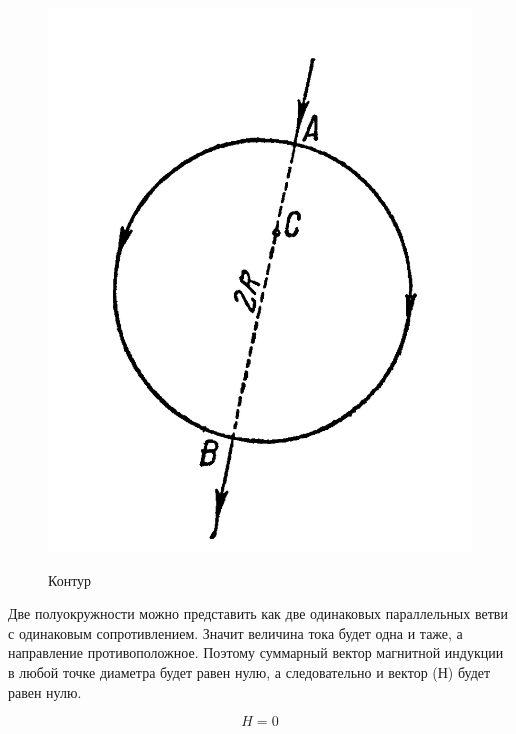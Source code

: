 \begin{figure}[H]
	\centering
	\includegraphics[width=0.4\linewidth]{task_pic}
	\label{task_pic}
	\caption{Контур}
\end{figure}

Две полуокружности можно представить как две одинаковых параллельных ветви с одинаковым сопротивлением.
Значит величина тока будет одна и таже, а направление противоположное. Поэтому суммарный вектор магнитной
индукции в любой точке диаметра будет равен нулю, а следовательно и вектор ($ Н $) будет равен нулю.

\begin{equation}
	H = 0
\end{equation}
